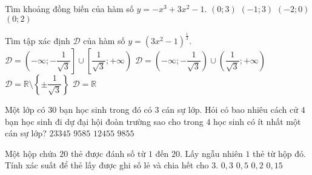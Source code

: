 \begin{ex}%
Tìm khoảng đồng biến của hàm số $y=-x^3+3x^2-1$.
\choice
{$(0;3)$}
{$(-1;3)$}
{$(-2;0)$}
{\True $(0;2)$}
\end{ex}
\begin{ex}%
Tìm tập xác định $\mathscr{D}$ của hàm số $y=(3x^2-1)^\frac{1}{3}$.
\choice
{$\mathscr{D}=\left(-\infty;-\dfrac{1}{\sqrt{3}}\right] \cup \left[\dfrac{1}{\sqrt{3}};+\infty \right)$}
{\True $\mathscr{D}=\left(-\infty;-\dfrac{1}{\sqrt{3}}\right) \cup \left(\dfrac{1}{\sqrt{3}};+\infty \right)$}
{$\mathscr{D}=\mathbb{R}\setminus \left\{ \pm \dfrac{1}{\sqrt{3}}\right\}$}
{$\mathscr{D}=\mathbb{R}$}

\end{ex}
\begin{ex}%
Một lớp có $30$ bạn học sinh trong đó có $3$ cán sự lớp. Hỏi có bao nhiêu cách cử $4$ bạn học sinh đi dự đại hội đoàn trường sao cho trong $4$ học sinh có ít nhất một cán sự lớp?
\choice
{$23345$}
{$9585$}
{\True $12455$}
{$9855$}
\end{ex}
\begin{ex}%
Một hộp chứa $20$ thẻ được đánh số từ $1$ đến $20$. Lấy ngẫu nhiên $1$ thẻ từ hộp đó. Tính xác suất để thẻ lấy được ghi số lẻ và chia hết cho $3$.
\choice
{$0{,}3$}
{$0{,}5$}
{$0{,}2$}
{\True $0{,}15$}
\end{ex}
